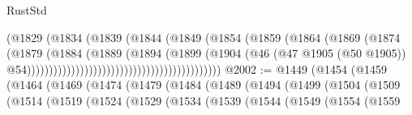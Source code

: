 \begin{lexlean}{RustStd}
\begin{coremodule}
                                                          (@1829
                                                            (@1834
                                                              (@1839
                                                                (@1844
                                                                  (@1849
                                                                    (@1854
                                                                      (@1859
                                                                        (@1864
                                                                          (@1869
                                                                            (@1874
                                                                              (@1879
                                                                                (@1884
                                                                                  (@1889
                                                                                    (@1894
                                                                                      (@1899
                                                                                        (@1904
                                                                                          (@46
                                                                                            (@47
                                                                                              @1905
                                                                                              (@50
                                                                                                @1905))
                                                                                            @54))))))))))))))))))))))))))))))))))))))))))))
@2002 := @1449
    (@1454
      (@1459
        (@1464
          (@1469
            (@1474
              (@1479
                (@1484
                  (@1489
                    (@1494
                      (@1499
                        (@1504
                          (@1509
                            (@1514
                              (@1519
                                (@1524
                                  (@1529
                                    (@1534
                                      (@1539
                                        (@1544
                                          (@1549
                                            (@1554
                                              (@1559

\end{coremodule}
\end{lexlean}
